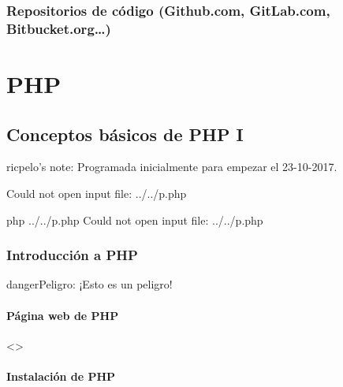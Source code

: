 \documentclass[a4paper,12pt,spanish]{sphinxmanual}
\begin{document}
\section{Repositorios de código (Github.com, GitLab.com, Bitbucket.org…)}
\label{\detokenize{introduccion:repositorios-de-codigo-github-com-gitlab-com-bitbucket-org}}

\part{PHP}
\label{\detokenize{php:php}}\label{\detokenize{php::doc}}

\chapter{Conceptos básicos de PHP I}
\label{\detokenize{php:conceptos-basicos-de-php-i}}
ricpelo’s note: Programada inicialmente para empezar el 23-10-2017. \sphinxcode{\sphinxupquote{\_\_\_\_\_\_}}

%
\begin{sphinxVerbatim}[commandchars=\\\{\}]
Could not open input file: ../../p.php
\end{sphinxVerbatim}

%
\begin{sphinxVerbatim}[commandchars=\\\{\}]
\PYGZdl{} php ../../p.php
Could not open input file: ../../p.php
\end{sphinxVerbatim}


\section{Introducción a PHP}
\label{\detokenize{php:introduccion-a-php}}
\begin{sphinxadmonition}{danger}{Peligro:}
¡Esto es un peligro!
\end{sphinxadmonition}


\subsection{Página web de PHP}
\label{\detokenize{php:pagina-web-de-php}}
\textless{}\textgreater{}


\subsection{Instalación de PHP}
\label{\detokenize{php:instalacion-de-php}}
\end{document}
